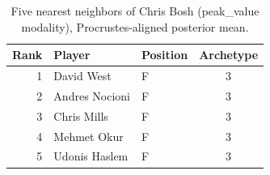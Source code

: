 \begin{table}[htbp]
  \centering\small
  \begin{tabular}{rllc}
    \toprule
    Rank & Player & Position & Archetype \\
    \midrule
    1 & David West & F & 3 \\
    2 & Andres Nocioni & F & 3 \\
    3 & Chris Mills & F & 3 \\
    4 & Mehmet Okur & F & 3 \\
    5 & Udonis Haslem & F & 3 \\
    \bottomrule
  \end{tabular}
  \caption{Five nearest neighbors of Chris Bosh (peak_value modality), Procrustes-aligned posterior mean.}
  \label{tab:Chris_Bosh_neighbors_peak_value}
\end{table}

